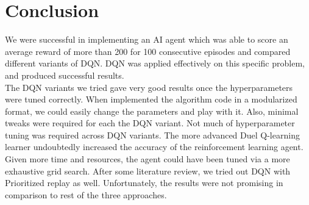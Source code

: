 \section{Conclusion}
\label{sec:conclusion}

We were successful in implementing an AI agent which was able to score an average reward of more than 200 for 100 consecutive episodes and compared different variants of DQN. DQN was applied effectively on this specific problem, and produced successful results.  \\

The DQN variants we tried gave very good results once the hyperparameters were tuned correctly. When implemented the algorithm code in a modularized format, we could easily change the parameters and play with it. Also, minimal tweaks were required for each the DQN variant. Not much of hyperparameter tuning was required across DQN variants. The more advanced Duel Q-learning learner undoubtedly increased the accuracy of the reinforcement learning agent. Given more time and resources, the agent could have been tuned via a more exhaustive grid search. After some literature review, we tried out DQN with Prioritized replay as well. Unfortunately, the results were not promising in comparison to rest of the three approaches. 